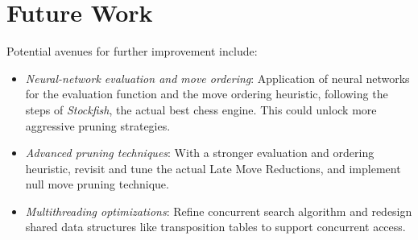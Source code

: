 \section{Future Work}

\noindent Potential avenues for further improvement include:

\begin{itemize}[itemsep=1pt]
    \item \textit{Neural-network evaluation and move ordering}:  
    Application of neural networks for the evaluation function and the move ordering heuristic, following the steps of \textit{Stockfish}, the actual best chess engine. This could unlock more aggressive pruning strategies.
    \item \textit{Advanced pruning techniques}:  
    With a stronger evaluation and ordering heuristic, revisit and tune the actual Late Move Reductions, and implement null move pruning technique.
    \item \textit{Multithreading optimizations}:  
    Refine concurrent search algorithm and redesign shared data structures like transposition tables to support concurrent access.
\end{itemize}
